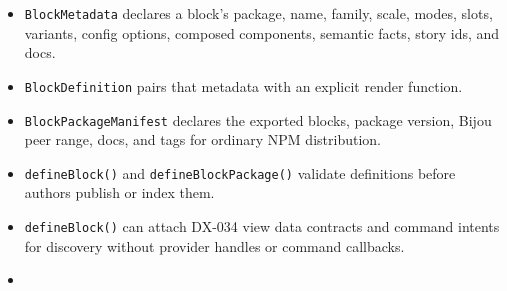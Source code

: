 \begin{itemize}
\tightlist
\item
  \texttt{B\allowbreak{}l\allowbreak{}o\allowbreak{}c\allowbreak{}k\allowbreak{}M\allowbreak{}e\allowbreak{}t\allowbreak{}a\allowbreak{}d\allowbreak{}a\allowbreak{}t\allowbreak{}a} declares a block's package, name, family, scale, modes, slots, variants, config options, composed components, semantic facts, story ids, and docs.
\item
  \texttt{B\allowbreak{}l\allowbreak{}o\allowbreak{}c\allowbreak{}k\allowbreak{}D\allowbreak{}e\allowbreak{}f\allowbreak{}i\allowbreak{}n\allowbreak{}i\allowbreak{}t\allowbreak{}i\allowbreak{}o\allowbreak{}n} pairs that metadata with an explicit render function.
\item
  \texttt{B\allowbreak{}l\allowbreak{}o\allowbreak{}c\allowbreak{}k\allowbreak{}P\allowbreak{}a\allowbreak{}c\allowbreak{}k\allowbreak{}a\allowbreak{}g\allowbreak{}e\allowbreak{}M\allowbreak{}a\allowbreak{}n\allowbreak{}i\allowbreak{}f\allowbreak{}e\allowbreak{}s\allowbreak{}t} declares the exported blocks, package version, Bijou peer range, docs, and tags for ordinary NPM distribution.
\item
  \texttt{d\allowbreak{}e\allowbreak{}f\allowbreak{}i\allowbreak{}n\allowbreak{}e\allowbreak{}B\allowbreak{}l\allowbreak{}o\allowbreak{}c\allowbreak{}k\allowbreak{}(\allowbreak{})} and \texttt{d\allowbreak{}e\allowbreak{}f\allowbreak{}i\allowbreak{}n\allowbreak{}e\allowbreak{}B\allowbreak{}l\allowbreak{}o\allowbreak{}c\allowbreak{}k\allowbreak{}P\allowbreak{}a\allowbreak{}c\allowbreak{}k\allowbreak{}a\allowbreak{}g\allowbreak{}e\allowbreak{}(\allowbreak{})} validate definitions before authors publish or index them.
\item
  \texttt{d\allowbreak{}e\allowbreak{}f\allowbreak{}i\allowbreak{}n\allowbreak{}e\allowbreak{}B\allowbreak{}l\allowbreak{}o\allowbreak{}c\allowbreak{}k\allowbreak{}(\allowbreak{})} can attach DX-034 view data contracts and command intents for discovery without provider handles or command callbacks.
\item

\end{itemize}
